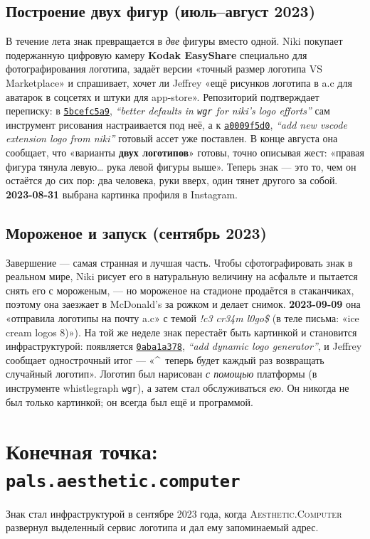 \documentclass[10pt,letterpaper,twocolumn]{article}
\newcommand{\ac}{\textsc{Aesthetic}{\color{acpink}.}\textsc{Computer}}
\newcommand{\commit}[2]{\href{https://github.com/whistlegraph/aesthetic-computer/commit/#1}{\texttt{#1}}, \emph{``#2''}}
\begin{document}
\subsection{Построение двух фигур (июль--август 2023)}
В течение лета знак превращается в \emph{две} фигуры вместо одной. Niki
покупает подержанную цифровую камеру \textbf{Kodak EasyShare} специально
для фотографирования логотипа, задаёт версии «точный размер логотипа VS
Marketplace» и спрашивает, хочет ли Jeffrey «ещё рисунков логотипа в a.c
для аватарок в соцсетях и штуки для app-store». Репозиторий подтверждает
переписку: в \commit{5bcefc5a9}{better defaults in \texttt{wgr} for niki's
logo efforts} сам инструмент рисования настраивается под неё, а к
\commit{a0009f5d0}{add new vscode extension logo from niki} готовый ассет
уже поставлен. В конце августа она сообщает, что «варианты \textbf{двух
логотипов}» готовы, точно описывая жест: «правая фигура тянула
левую\dots{} рука левой фигуры выше». Теперь знак --- это то, чем он
остаётся до сих пор: два человека, руки вверх, один тянет другого за собой.
\textbf{2023-08-31} выбрана картинка профиля в Instagram.

\subsection{Мороженое и запуск (сентябрь 2023)}
Завершение --- самая странная и лучшая часть. Чтобы сфотографировать знак в
реальном мире, Niki рисует его в натуральную величину на асфальте и
пытается снять его с мороженым, --- но мороженое на стадионе продаётся в
стаканчиках, поэтому она заезжает в McDonald's за рожком и делает снимок.
\textbf{2023-09-09} она «отправила логотипы на почту a.c» с темой
\emph{!c3 cr34m l0go\$} (в теле письма: «ice cream logos 8)»). На той же
неделе знак перестаёт быть картинкой и становится инфраструктурой:
появляется \commit{0aba1a378}{add dynamic logo generator}, и Jeffrey
сообщает однострочный итог --- «\^{}\ теперь будет каждый раз возвращать
случайный логотип». Логотип был нарисован \emph{с помощью} платформы (в
инструменте whistlegraph \texttt{wgr}), а затем стал обслуживаться
\emph{ею}. Он никогда не был только картинкой; он всегда был ещё и
программой.

\section{Конечная точка: \texttt{pals.aesthetic.computer}}

Знак стал инфраструктурой в сентябре 2023 года, когда \ac{} развернул
выделенный сервис логотипа и дал ему запоминаемый адрес.
\end{document}
